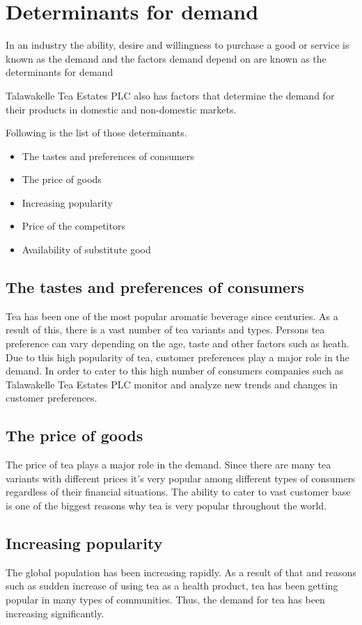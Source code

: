 \documentclass[12pt]{report}
\begin{document}
\section{Determinants for demand}
In an industry the ability, desire and willingness to purchase a good or service is known as the demand and the factors demand depend on are known as the determinants for demand

Talawakelle Tea Estates PLC also has factors that determine the demand for their products in domestic and non-domestic markets.

\noindent
Following is the list of those determinants.
\begin{itemize}
	\item {The tastes and preferences of consumers}
	\item {The price of goods}
	\item {Increasing popularity}
	\item {Price of the competitors}
	\item {Availability of substitute good}
\end{itemize}

\subsection{The tastes and preferences of consumers}
Tea has been one of the most popular aromatic beverage since centuries. As a result of this, there is a vast number of tea variants and types. Persons tea preference can vary depending on the age, taste and other factors such as heath. Due to this high popularity of tea, customer preferences play a major role in the demand. In order to cater to this  high number of consumers companies such as Talawakelle Tea Estates PLC monitor and analyze new trends and changes in customer preferences.

\subsection{The price of goods}
The price of tea plays a major role in the demand. Since there are many tea variants with different prices it's very popular among different types of consumers regardless of their financial situations. The ability to cater to vast customer base is one of the biggest reasons why tea is very popular throughout the world.

\subsection{Increasing popularity}
The global population has been increasing rapidly. As a result of that and reasons such as sudden increase of using tea as a health product, tea has been getting popular in many types of communities. Thus, the demand for tea has been increasing significantly.
\end{document}
